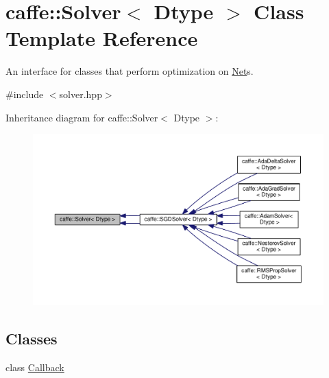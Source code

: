 \hypertarget{classcaffe_1_1_solver}{}\section{caffe\+:\+:Solver$<$ Dtype $>$ Class Template Reference}
\label{classcaffe_1_1_solver}


An interface for classes that perform optimization on \mbox{\hyperlink{classcaffe_1_1_net}{Net}}s.  




{\ttfamily \#include $<$solver.\+hpp$>$}



Inheritance diagram for caffe\+:\+:Solver$<$ Dtype $>$\+:
\nopagebreak
\begin{figure}[H]
\begin{center}
\leavevmode
\includegraphics[width=350pt]{classcaffe_1_1_solver__inherit__graph}
\end{center}
\end{figure}
\subsection*{Classes}
\begin{DoxyCompactItemize}
\item 
class \mbox{\hyperlink{classcaffe_1_1_solver_1_1_callback}{Callback}}
\end{DoxyCompactItemize}

